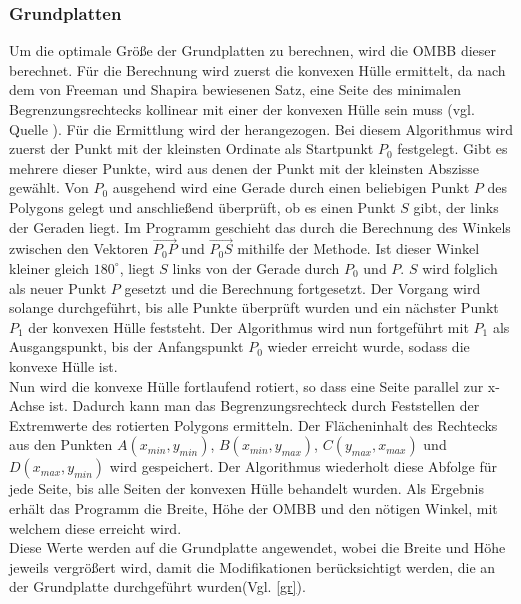 \subsubsection{Grundplatten}
Um die optimale Größe der Grundplatten zu berechnen, wird die OMBB dieser berechnet.
Für die Berechnung wird zuerst die konvexen Hülle ermittelt, da nach dem von Freeman und Shapira bewiesenen Satz, eine Seite des minimalen Begrenzungsrechtecks kollinear mit einer der konvexen Hülle sein muss (vgl. Quelle \cite{ombb}).
Für die Ermittlung wird der  herangezogen.
Bei diesem Algorithmus wird zuerst der Punkt mit der kleinsten Ordinate als Startpunkt $P_0$ festgelegt.
Gibt es mehrere dieser Punkte, wird aus denen der Punkt mit der kleinsten Abszisse gewählt.
Von $P_0$ ausgehend wird eine Gerade durch einen beliebigen Punkt $P$ des Polygons gelegt und anschließend überprüft, ob es einen Punkt $S$ gibt, der links der Geraden liegt.
Im Programm geschieht das durch die Berechnung des Winkels zwischen den Vektoren $\overrightarrow{{P_0}P}$ und $\overrightarrow{{P_0}S}$ mithilfe der  Methode.
Ist dieser Winkel kleiner gleich $180^\circ$, liegt $S$ links von der Gerade durch $P_0$ und $P$.
$S$ wird folglich als neuer Punkt $P$ gesetzt und die Berechnung fortgesetzt.
Der Vorgang wird solange durchgeführt, bis alle Punkte überprüft wurden und ein nächster Punkt $P_1$ der konvexen Hülle feststeht.
Der Algorithmus wird nun fortgeführt mit $P_1$ als Ausgangspunkt, bis der Anfangspunkt $P_0$ wieder erreicht wurde, sodass die konvexe Hülle  ist.\\
Nun wird die konvexe Hülle fortlaufend rotiert, so dass eine Seite parallel zur x-Achse ist.
Dadurch kann man das Begrenzungsrechteck durch Feststellen der Extremwerte des rotierten Polygons ermitteln.
Der Flächeninhalt des Rechtecks aus den Punkten $A(x_{min}, y_{min})$, $B(x_{min}, y_{max})$, $C(y_{max}, x_{max})$ und $D(x_{max}, y_{min})$ wird gespeichert.
Der Algorithmus wiederholt diese Abfolge für jede Seite, bis alle Seiten der konvexen Hülle behandelt wurden. %
Als Ergebnis erhält das Programm die Breite, Höhe der OMBB und den nötigen Winkel, mit welchem diese erreicht wird.\\
Diese Werte werden auf die Grundplatte angewendet, wobei die Breite und Höhe jeweils vergrößert wird, damit die Modifikationen berücksichtigt werden, die an der Grundplatte durchgeführt wurden(Vgl. \ref{gr}).